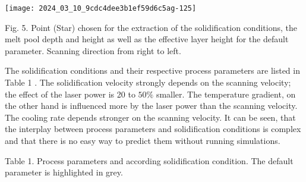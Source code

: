 \documentclass[10pt]{article}
\begin{document}
\begin{center}
\texttt{[image: 2024\_03\_10\_9cdc4dee3b1ef59d6c5ag-125]}
\end{center}

Fig. 5. Point (Star) chosen for the extraction of the solidification conditions, the melt pool depth and height as well as the effective layer height for the default parameter. Scanning direction from right to left.

The solidification conditions and their respective process parameters are listed in Table 1 . The solidification velocity strongly depends on the scanning velocity; the effect of the laser power is 20 to $50 \%$ smaller. The temperature gradient, on the other hand is influenced more by the laser power than the scanning velocity. The cooling rate depends stronger on the scanning velocity. It can be seen, that the interplay between process parameters and solidification conditions is complex and that there is no easy way to predict them without running simulations.

Table 1. Process parameters and according solidification condition. The default parameter is highlighted in grey.
\end{document}
